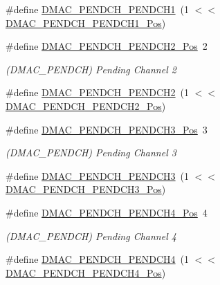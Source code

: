 \begin{DoxyCompactItemize}
\#define \mbox{\hyperlink{group___s_a_m_d21___d_m_a_c_gaf4190219b39d90bedd4a56ab6ae60146}{D\+M\+A\+C\+\_\+\+P\+E\+N\+D\+C\+H\+\_\+\+P\+E\+N\+D\+C\+H1}}~(1 $<$$<$ \mbox{\hyperlink{group___s_a_m_d21___d_m_a_c_gad39b7a6253d67e4533c031d56bcf80b0}{D\+M\+A\+C\+\_\+\+P\+E\+N\+D\+C\+H\+\_\+\+P\+E\+N\+D\+C\+H1\+\_\+\+Pos}})
\item 
\#define \mbox{\hyperlink{group___s_a_m_d21___d_m_a_c_ga67157f108f942dcda1112a71add5e63e}{D\+M\+A\+C\+\_\+\+P\+E\+N\+D\+C\+H\+\_\+\+P\+E\+N\+D\+C\+H2\+\_\+\+Pos}}~2
\begin{DoxyCompactList}\small\item\em (D\+M\+A\+C\+\_\+\+P\+E\+N\+D\+CH) Pending Channel 2 \end{DoxyCompactList}\item 
\#define \mbox{\hyperlink{group___s_a_m_d21___d_m_a_c_ga9c1646c7d84e8a5750b483410f59bb8f}{D\+M\+A\+C\+\_\+\+P\+E\+N\+D\+C\+H\+\_\+\+P\+E\+N\+D\+C\+H2}}~(1 $<$$<$ \mbox{\hyperlink{group___s_a_m_d21___d_m_a_c_ga67157f108f942dcda1112a71add5e63e}{D\+M\+A\+C\+\_\+\+P\+E\+N\+D\+C\+H\+\_\+\+P\+E\+N\+D\+C\+H2\+\_\+\+Pos}})
\item 
\#define \mbox{\hyperlink{group___s_a_m_d21___d_m_a_c_gaab6a540d960e9ebf33586e193f6eb3fe}{D\+M\+A\+C\+\_\+\+P\+E\+N\+D\+C\+H\+\_\+\+P\+E\+N\+D\+C\+H3\+\_\+\+Pos}}~3
\begin{DoxyCompactList}\small\item\em (D\+M\+A\+C\+\_\+\+P\+E\+N\+D\+CH) Pending Channel 3 \end{DoxyCompactList}\item 
\#define \mbox{\hyperlink{group___s_a_m_d21___d_m_a_c_ga0929ca10708f464fc4e4cdbf89cd5568}{D\+M\+A\+C\+\_\+\+P\+E\+N\+D\+C\+H\+\_\+\+P\+E\+N\+D\+C\+H3}}~(1 $<$$<$ \mbox{\hyperlink{group___s_a_m_d21___d_m_a_c_gaab6a540d960e9ebf33586e193f6eb3fe}{D\+M\+A\+C\+\_\+\+P\+E\+N\+D\+C\+H\+\_\+\+P\+E\+N\+D\+C\+H3\+\_\+\+Pos}})
\item 
\#define \mbox{\hyperlink{group___s_a_m_d21___d_m_a_c_gaa94dffd07747dd354da6950c442ddb7c}{D\+M\+A\+C\+\_\+\+P\+E\+N\+D\+C\+H\+\_\+\+P\+E\+N\+D\+C\+H4\+\_\+\+Pos}}~4
\begin{DoxyCompactList}\small\item\em (D\+M\+A\+C\+\_\+\+P\+E\+N\+D\+CH) Pending Channel 4 \end{DoxyCompactList}\item 
\#define \mbox{\hyperlink{group___s_a_m_d21___d_m_a_c_ga77bb07be9b512ad4babe3e942bfe7807}{D\+M\+A\+C\+\_\+\+P\+E\+N\+D\+C\+H\+\_\+\+P\+E\+N\+D\+C\+H4}}~(1 $<$$<$ \mbox{\hyperlink{group___s_a_m_d21___d_m_a_c_gaa94dffd07747dd354da6950c442ddb7c}{D\+M\+A\+C\+\_\+\+P\+E\+N\+D\+C\+H\+\_\+\+P\+E\+N\+D\+C\+H4\+\_\+\+Pos}})

\end{DoxyCompactItemize}

